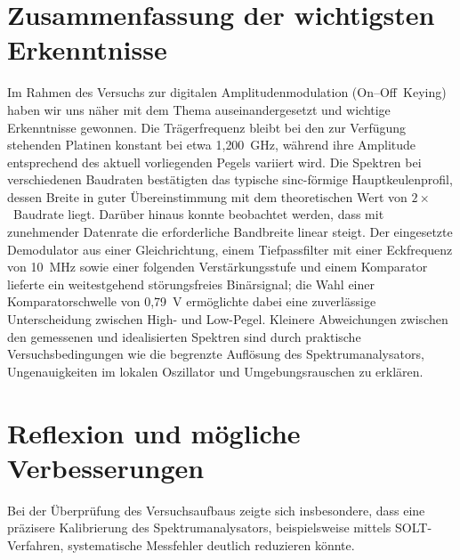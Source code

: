 \section{Zusammenfassung der wichtigsten Erkenntnisse}
Im Rahmen des Versuchs zur digitalen Amplitudenmodulation (On--Off~Keying) haben wir uns näher mit dem Thema auseinandergesetzt und wichtige Erkenntnisse gewonnen. Die Trägerfrequenz bleibt bei den zur Verfügung stehenden Platinen konstant bei etwa 1{,}200~GHz, während ihre Amplitude entsprechend des aktuell vorliegenden Pegels variiert wird.
Die Spektren bei verschiedenen Baudraten bestätigten das typische sinc-förmige Hauptkeulenprofil, dessen Breite in guter Übereinstimmung mit dem theoretischen Wert von $2 \times$~Baudrate liegt. 
Darüber hinaus konnte beobachtet werden, dass mit zunehmender Datenrate die erforderliche Bandbreite linear steigt.
Der eingesetzte Demodulator aus einer Gleichrichtung, einem Tiefpassfilter mit einer Eckfrequenz von 10~MHz sowie einer folgenden Verstärkungsstufe und einem Komparator lieferte ein weitestgehend störungsfreies Binärsignal; die Wahl einer Komparatorschwelle von 0,79~V ermöglichte dabei eine zuverlässige Unterscheidung zwischen High- und Low-Pegel. Kleinere Abweichungen zwischen den gemessenen und idealisierten Spektren sind durch praktische Versuchsbedingungen wie die begrenzte Auflösung des Spektrumanalysators, Ungenauigkeiten im lokalen Oszillator und Umgebungsrauschen zu erklären.

\section{Reflexion und mögliche Verbesserungen}
Bei der Überprüfung des Versuchsaufbaus zeigte sich insbesondere, dass eine präzisere Kalibrierung des Spektrumanalysators, beispielsweise mittels SOLT-Verfahren, systematische Messfehler deutlich reduzieren könnte. 
\clearpage